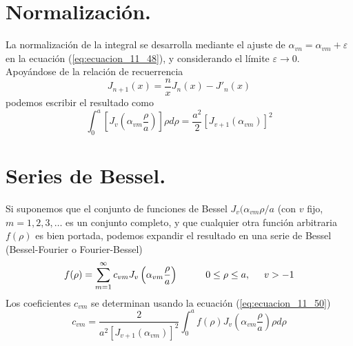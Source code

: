 \section{Normalización.}
La normalización de la integral se desarrolla mediante el ajuste de $\alpha_{vn} = \alpha_{vm} + \varepsilon$ en la ecuación (\ref{eq:ecuacion_11_48}), y considerando el límite $\varepsilon \to 0$. Apoyándose de la relación de recuerrencia
\begin{equation}
J_{n+1}(x) = \dfrac{n}{x} J_{n}(x) - J'_{n}(x)
\label{eq:ecuacion_11_16}
\end{equation}
podemos escribir el resultado como
\begin{equation}
\int_{0}^{a} \left[ J_{v} \left( \alpha_{vm} \dfrac{\rho}{a} \right) \right] \rho d \rho = \dfrac{a^{2}}{2} [ J_{v+1} (\alpha_{vm} )]^{2}
\label{eq:ecuacion_11_50}
\end{equation}
\section{Series de Bessel.}
Si suponemos que el conjunto de funciones de Bessel $J_{v} (\alpha_{vm} \rho /a$ (con $v$ fijo, $m =1,2,3,\ldots$ es un conjunto completo, y que cualquier otra función arbitraria $f(\rho)$ es bien portada, podemos expandir el resultado en una serie de Bessel (Bessel-Fourier o Fourier-Bessel)
\begin{equation}
f(\rho) = \sum_{m=1}^{\infty} c_{vm} J_{v} \left( \alpha_{vm} \dfrac{\rho}{a} \right) \hspace{1cm} 0 \leq \rho \leq a, \hspace{0.5cm} v > -1
\label{eq:ecuacion_11_51}
\end{equation}
Los coeficientes $c_{vm}$ se determinan usando la ecuación (\ref{eq:ecuacion_11_50})
\begin{equation}
c_{vm} = \dfrac{2}{a^{2}[J_{v+1} (\alpha_{vm})]^{2}} \int_{0}^{a} f(\rho) J_{v} \left( \alpha_{vm} \dfrac{\rho}{a} \right) \rho d \rho 
\label{eq:ecuacion_11_52}
\end{equation}
